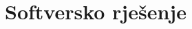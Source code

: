 \appendix
\setcounter{chapter}{0}
\renewcommand{\chaptername}{Dodaci}
\renewcommand{\theequation}{\Alph{chapter}.\arabic{section}.\arabic{equation}}
\setcounter{equation}{0}
\chapter{Softversko rješenje\label{ch:srjes}}




